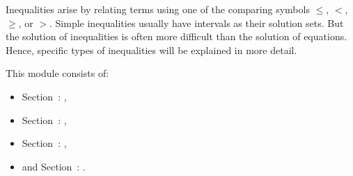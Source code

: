 



%
%

\begin{MSectionStart}

Inequalities arise by relating terms using one of the comparing symbols $\leq$, $<$, $\geq$, or $>$. Simple 
inequalities usually have intervals as their solution sets. But the solution of inequalities is often
more difficult than the solution of equations. Hence, specific types of inequalities will be explained
in more detail.

This module consists of:

\begin{itemize}
\item{Section~: ,}
\item{Section~: ,}
\item{Section~: ,}
\item{and Section~: .}
\end{itemize}

\end{MSectionStart}


